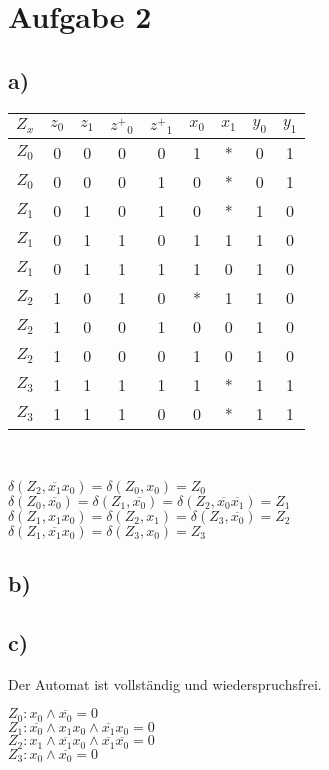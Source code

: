 \documentclass{article}
\begin{document}
\section*{Aufgabe 2}

	\subsection*{a)}

		\begin{tabular}{|c|c c|c c|c c|c c|} \hline
		$Z_x$ &$z_0$ & $z_1$ & ${z^+}_0$ & ${z^+}_1$ & $x_0$ & $x_1$ & $y_0$ & $y_1$\\ \hline
		$Z_0$&0&0&0&0&1&*&0&1 \\
		$Z_0$&0&0&0&1&0&*&0&1 \\
		$Z_1$&0&1&0&1&0&*&1&0 \\
		$Z_1$&0&1&1&0&1&1&1&0 \\
		$Z_1$&0&1&1&1&1&0&1&0 \\
		$Z_2$&1&0&1&0&*&1&1&0 \\
		$Z_2$&1&0&0&1&0&0&1&0 \\
		$Z_2$&1&0&0&0&1&0&1&0 \\
		$Z_3$&1&1&1&1&1&*&1&1 \\
		$Z_3$&1&1&1&0&0&*&1&1 \\\hline

		\end{tabular}
 
 \		


	$\delta(Z_2, \overline{x_1}x_0)=\delta(Z_0, x_0)=Z_0$\\
	$\delta(Z_0,\overline{x_0})= \delta(Z_1,\overline{x_0})=\delta(Z_2,\overline{x_0}\overline{x_1})=Z_1$ \\
	$\delta(Z_1,x_1 x_0)=\delta(Z_2,x_1)=\delta(Z_3,\overline{x_0})=Z_2$\\
	$\delta(Z_1, \overline{x_1}x_0)=\delta(Z_3,x_0)=Z_3$\\

	\subsection*{b)}



	\subsection*{c)}

		Der Automat ist vollständig und wiederspruchsfrei. 

		$Z_0: x_0\wedge \overline{x_0}=0$ \\
		$Z_1: \overline{x_0} \wedge x_1x_0 \wedge \overline{x_1}x_0 =0 $ \\
		$Z_2: x_1\wedge\overline{x_1}x_0\wedge \overline{x_1}\overline{x_0}=0$ \\
		$Z_3: x_0\wedge \overline{x_0}=0$
\end{document}
